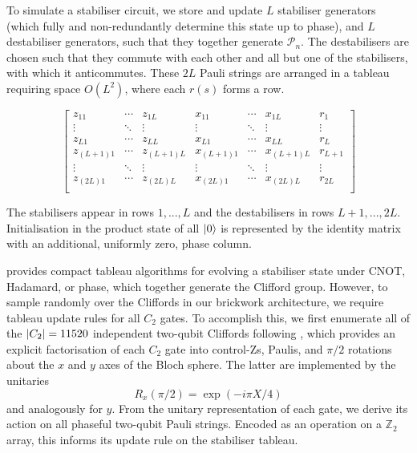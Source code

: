 \documentclass[10pt]{article}
\renewcommand{\arraystretch}{1.5}
\begin{document}
\begin{appendices}
To simulate a stabiliser circuit, we store and update $L$ stabiliser generators (which fully and non-redundantly determine this state up to phase), and $L$ destabiliser generators, such that they together generate $\mathcal{P}_n$. The destabilisers are chosen such that they commute with each other and all but one of the stabilisers, with which it anticommutes. These $2L$ Pauli strings are arranged in a tableau requiring space $O(L^2)$, where each $r(s)$ forms a row.

\renewcommand*{\arraystretch}{1.2}
\begin{equation}
\begin{bmatrix}
z_{11} & \cdots & z_{1L} & x_{11} & \cdots & x_{1L} & r_1\\
\vdots & \ddots & \vdots & \vdots & \ddots & \vdots & \vdots \\
z_{L1} & \cdots & z_{LL} & x_{L1} & \cdots & x_{LL} & r_L\\
z_{(L+1)1} & \cdots & z_{(L+1)L} & x_{(L+1)1} & \cdots & x_{(L+1)L} & r_{L+1}\\
\vdots & \ddots & \vdots & \vdots & \ddots & \vdots & \vdots \\
z_{(2L)1} & \cdots & z_{(2L)L} & x_{(2L)1} & \cdots & x_{(2L)L} & r_{2L} \\
\end{bmatrix}
\end{equation}
\renewcommand*{\arraystretch}{1.5}

The stabilisers appear in rows $1,...,L$ and the destabilisers in rows $L+1,...,2L$. Initialisation in the product state of all $\ket{0}$ is represented by the identity matrix with an additional, uniformly zero, phase column.


\cite{aaronson2004improved} provides compact tableau algorithms for evolving a stabiliser state under CNOT, Hadamard, or phase, which together generate the Clifford group. However, to sample randomly over the Cliffords in our brickwork architecture, we require tableau update rules for all $C_2$ gates. To accomplish this, we first enumerate all of the $\abs{C_2} = 11520$ independent two-qubit Cliffords following \cite{barendssupplementary}, which provides an explicit factorisation of each $C_2$ gate into control-Zs, Paulis, and $\pi/2$ rotations about the $x$ and $y$ axes of the Bloch sphere. The latter are implemented by the unitaries
\begin{equation}
R_x(\pi/2) = \exp(-i\pi X/4)
\end{equation}
and analogously for $y$. From the unitary representation of each gate, we derive its action on all phaseful two-qubit Pauli strings. Encoded as an operation on a $\mathbb{Z}_2$ array, this informs its update rule on the stabiliser tableau. 


\end{appendices}
\end{document}

